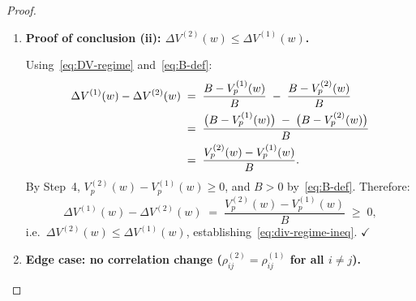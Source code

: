 \documentclass[12pt,openany]{book}
\newcommand{\bfw}{\mathbf{w}}
\numberwithin{equation}{chapter}
\theoremstyle{plain}
\theoremstyle{definition}
\theoremstyle{remark}
\def\bfw{w}%
\begin{document}
\begin{proof}
\begin{enumerate}
        From Definition~\ref{def:div-benefit}, for regime $r_k$:
        \begin{equation}
          \Delta V^{(k)}(\bfw)
          \;=\; \frac{\displaystyle\sum_{i=1}^{n} w_i\,(\sigma_i^{(k)})^2
                      \;-\; V_p^{(k)}(\bfw)}
                     {\displaystyle\sum_{i=1}^{n} w_i\,(\sigma_i^{(k)})^2}.
          \label{eq:DV-regime}
        \end{equation}
        Denote the common weighted-variance benchmark (fixed under
        \textup{(A-R4)}) by
        \begin{equation}
          B \;:=\; \sum_{i=1}^{n} w_i\,\sigma_i^2
          \;=\; \sum_{i=1}^{n} w_i\,(\sigma_i^{(1)})^2
          \;=\; \sum_{i=1}^{n} w_i\,(\sigma_i^{(2)})^2
          \;>\; 0,
          \label{eq:B-def}
        \end{equation}
        where positivity follows from $w_i \geq 0$,
        $\sum_i w_i = 1$, $\sigma_i > 0$, and at least one
        $w_i > 0$.

  \item \textbf{Proof of conclusion (ii):
        $\Delta V^{(2)}(\bfw) \leq \Delta V^{(1)}(\bfw)$.}

        Using~\eqref{eq:DV-regime} and~\eqref{eq:B-def}:
        \begin{align}
          \Delta V^{(1)}(\bfw) - \Delta V^{(2)}(\bfw)
          &\;=\; \frac{B - V_p^{(1)}(\bfw)}{B}
                 \;-\; \frac{B - V_p^{(2)}(\bfw)}{B}
                 \notag \\
          &\;=\; \frac{
                   \bigl(B - V_p^{(1)}(\bfw)\bigr)
                   \;-\; \bigl(B - V_p^{(2)}(\bfw)\bigr)
                 }{B}
                 \notag \\
          &\;=\; \frac{V_p^{(2)}(\bfw) - V_p^{(1)}(\bfw)}{B}.
          \label{eq:DV-diff}
        \end{align}
        By Step~4, $V_p^{(2)}(\bfw) - V_p^{(1)}(\bfw) \geq 0$,
        and $B > 0$ by~\eqref{eq:B-def}.  Therefore:
        \begin{equation}
          \Delta V^{(1)}(\bfw) - \Delta V^{(2)}(\bfw)
          \;=\; \frac{V_p^{(2)}(\bfw) - V_p^{(1)}(\bfw)}{B}
          \;\geq\; 0,
        \end{equation}
        i.e.\ $\Delta V^{(2)}(\bfw) \leq \Delta V^{(1)}(\bfw)$,
        establishing~\eqref{eq:div-regime-ineq}.
        \hfill $\checkmark$

  \item \textbf{Edge case: no correlation change
        ($\rho_{ij}^{(2)} = \rho_{ij}^{(1)}$ for all $i \neq j$).}


\end{enumerate}
\end{proof}
\end{document}

